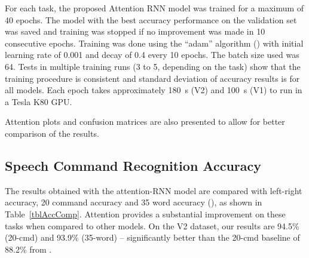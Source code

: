 \documentclass[authoryear, review, 12pt, 3p]{elsarticle}
\begin{document}
For each task, the proposed Attention RNN model was trained for a maximum of 40 epochs. The model with the best accuracy performance on the validation set was saved and training was stopped if no improvement was made in 10 consecutive epochs. Training was done using the ``adam'' algorithm (\cite{DBLP:journals/corr/KingmaB14}) with initial learning rate of 0.001 and decay of 0.4 every 10 epochs. The batch size used was 64. Tests in multiple training runs (3 to 5, depending on the task) show that the training procedure is consistent and standard deviation of accuracy results is  for all models. Each epoch takes approximately 180~s (V2) and 100~s (V1) to run in a Tesla K80 GPU.

Attention plots and confusion matrices are also presented to allow for better comparison of the results.

\subsection{Speech Command Recognition Accuracy}
\label{secSpeechCmdRecog}

The results obtained with the attention-RNN model are compared with left-right accuracy, 20 command accuracy and 35 word accuracy (\cite{DBLP:journals/corr/abs-1710-08377}), as shown in Table~\ref{tblAccComp}. Attention provides a substantial improvement on these tasks when compared to other models. On the V2 dataset, our results are 94.5\% (20-cmd) and 93.9\% (35-word) -- significantly better than the 20-cmd baseline of 88.2\% from \cite{DBLP:journals/corr/abs-1804-03209}.
\end{document}
